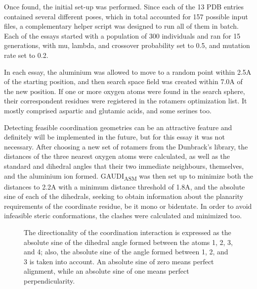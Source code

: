 Once found, the initial set-up was performed. Since each of the 13 PDB entries contained several different poses, which in total accounted for 157 possible input files, a complementary helper script was designed to run all of them in batch. Each of the essays started with a population of 300 individuals and ran for 15 generations, with mu, lambda, and crossover probability set to 0.5, and mutation rate set to 0.2.

In each essay, the aluminium was allowed to move to a random point within 2.5A of the starting position, and then search space field was created within 7.0A of the new position. If one or more oxygen atoms were found in the search sphere, their correspondent residues were registered in the rotamers optimization list. It mostly comprised aspartic and glutamic acids, and some serines too.

Detecting feasible coordination geometries can be an attractive feature and definitely will be implemented in the future, but for this essay it was not necessary. After choosing a new set of rotamers from the Dunbrack's library, the distances of the three nearest oxygen atoms were calculated, as well as the standard and dihedral angles that their two immediate neighbours, themselves, and the aluminium ion formed. GAUDI\textsubscript{ASM} was then set up to minimize both the distances to 2.2A with a minimum distance threshold of 1.8A, and the absolute sine of each of the dihedrals, seeking to obtain information about the planarity requirements of the coordinate residue, be it mono or bidentate. In order to avoid infeasible steric conformations, the clashes were calculated and minimized too.
\begin{figure}
\noindent{}
\caption[Dihedral angle calculation]{The directionality of the coordination interaction is expressed as the absolute sine of the dihedral angle formed between the atoms 1, 2, 3, and 4; also, the absolute sine of the angle formed between 1, 2, and 3 is taken into account. An absolute sine of zero means perfect alignment, while an absolute sine of one means perfect perpendicularity.}
\end{figure}

